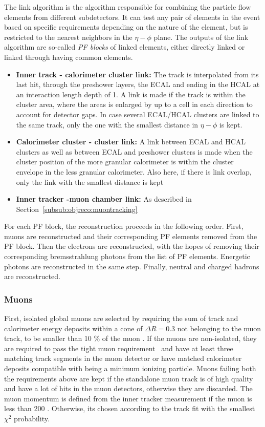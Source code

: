 The link algorithm is the algorithm responsible for combining the particle flow elements from different subdetectors.
It can test any pair of elements in the event based on specific requirements depending on the nature of the element, but is restricted to the nearest neighbors in the $\eta-\phi$ plane.
The outputs of the link algorithm are so-called \textit{PF blocks} of linked elements, either directly linked or linked through having common elements.
\begin{itemize}
  \item \textbf{Inner track - calorimeter cluster link:} The track is interpolated from its last hit, through the preshower layers, the ECAL and ending in the HCAL at an interaction length depth of 1. A link is made if the track is within the cluster area, where the areas is enlarged by up to a cell in each direction to account for detector gaps. In case several ECAL/HCAL clusters are linked to the same track, only the one with the smallest distance in $\eta-\phi$ is kept.

\item \textbf{Calorimeter cluster - cluster link:} A link between ECAL and HCAL clusters as well as between ECAL and preshower clusters
is made when the cluster position of the more granular calorimeter is within the cluster envelope in the less granular calorimeter. Also here, if there is link overlap, only the link with the smallest distance is kept

\item \textbf{Inner tracker -muon chamber link:} As described in Section~\ref{subsub:objreco:muontracking} 
\end{itemize}

For each PF block, the reconstruction proceeds in the following order.
First, muons are reconstructed and their corresponding PF elements removed from the PF block. Then the electrons are reconstructed, with the hopes of removing their corresponding bremsstrahlung photons from the list of PF elements. Energetic photons are reconstructed in the same step. Finally, neutral and charged hadrons are reconstructed.

\subsubsection{Muons}
\label{sec:objreco:muons}
First, isolated global muons are selected by requiring the sum of track \PT and calorimeter energy deposits within a cone of $\Delta R = 0.3$ not belonging to the muon track, to be smaller than 10 \% of the muon \PT.
If the muons are non-isolated, they are required to pass the tight muon requirement~\cite{1748-0221-7-10-P10002} and have at least three matching track segments in the muon detector or have matched calorimeter deposits compatible with being a minimum ionizing particle.
Muons failing both the requirements above are kept if the standalone muon track is of high quality and have a lot of hits in the muon detectors, otherwise they are discarded.
The muon momentum is defined from the inner tracker measurement if the muon \PT is less than 200 \GeV. Otherwise, its chosen according to the track fit with the smallest $\chi^2$ probability. \newline

